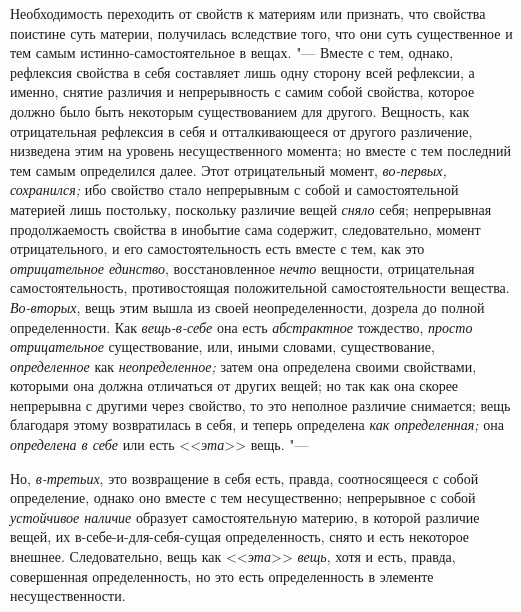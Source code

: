 Необходимость переходить от свойств к материям или признать, что свойства
поистине суть материи, получилась вследствие того, что они суть
существенное и тем самым истинно-самостоятельное в вещах. "--- Вместе с тем,
однако, рефлексия свойства в себя составляет лишь одну сторону всей
рефлексии, а именно, снятие различия и непрерывность с самим собой
свойства, которое должно было быть некоторым существованием для другого.
Вещность, как отрицательная рефлексия в себя и отталкивающееся от другого
различение, низведена этим на уровень несущественного момента; но вместе с
тем последний тем самым определился далее. Этот отрицательный момент,
{\em во-первых, сохранился;}
ибо свойство стало непрерывным с собой и самостоятельной материей лишь
постольку, поскольку различие вещей {\em сняло} себя;
непрерывная продолжаемость свойства в инобытие сама содержит,
следовательно, момент отрицательного, и его самостоятельность есть вместе с
тем, как это {\em отрицательное единство},
восстановленное {\em нечто} вещности, отрицательная
самостоятельность, противостоящая положительной самостоятельности вещества.
{\em Во-вторых}, вещь этим вышла из своей
неопределенности, дозрела до полной определенности. Как
{\em вещь-в-себе} она есть {\em абстрактное} тождество,
{\em просто отрицательное} существование, или, иными
словами, существование, {\em определенное} как
{\em неопределенное;} затем она определена своими
свойствами, которыми она должна отличаться от других вещей; но так как она
скорее непрерывна с другими через свойство, то это неполное различие
снимается; вещь благодаря этому возвратилась в себя, и теперь определена
{\em как определенная;} она {\em определена в себе} или есть
<<{\em эта}>> вещь. "---

Но, {\em в-третьих}, это возвращение в себя есть,
правда, соотносящееся с собой определение, однако оно вместе с тем
несущественно; непрерывное с собой {\em устойчивое наличие}
образует самостоятельную материю, в которой различие вещей, их
в-себе-и-для-себя-сущая определенность, снято и есть некоторое внешнее.
Следовательно, вещь как <<{\em эта}>> {\em вещь}, хотя и
есть, правда, совершенная определенность, но это есть определенность в
элементе несущественности.

